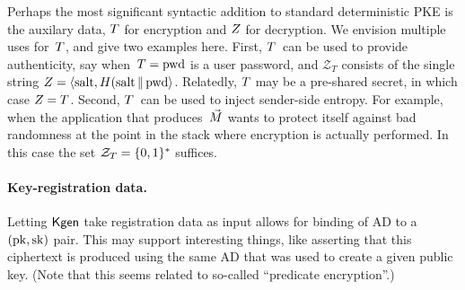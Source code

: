 Perhaps the most significant syntactic addition to standard deterministic PKE is the auxilary data, $T$ for encryption and $Z$ for decryption.  We envision multiple uses for~$T$, and give two examples here.  First, $T$~can be used to provide authenticity, say when~$T=\mathrm{pwd}$ is a user password, and $\mathcal{Z}_T$ consists of the single string $Z=\langle \mathrm{salt},H(\mathrm{salt} \,\|\, \mathrm{pwd} \rangle$.  Relatedly, $T$ may be a pre-shared secret, in which case $Z=T$.  Second, $T$~can be used to inject sender-side entropy.  For example, when the application that produces~$\vec{M}$ wants to protect itself against bad randomness at the point in the stack where encryption is actually performed.  In this case the set $\mathcal{Z}_T=\{0,1\}^*$ suffices. 
 
\paragraph{Key-registration data. } Letting $\mathsf{Kgen}$ take registration data as input allows for binding of AD to a $(\mathrm{pk},\mathrm{sk})$ pair.  This may support interesting things, like asserting that this ciphertext is produced using the same AD that was used to create a given public key.  (Note that this seems related to so-called ``predicate encryption''.)






